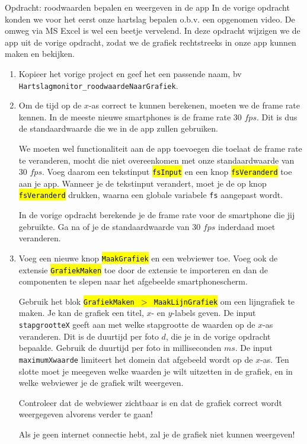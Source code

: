 \begin{opdracht}{Opdracht: roodwaarden bepalen en weergeven in de app}
	In de vorige opdracht konden we voor het eerst onze hartslag bepalen o.b.v. een opgenomen video. De omweg via MS Excel is wel een beetje vervelend. In deze opdracht wijzigen we de app uit de vorige opdracht, zodat we de grafiek rechtstreeks in onze app kunnen maken en bekijken.
	
	\begin{enumerate}
		\item Kopieer het vorige project en geef het een passende naam, bv \texttt{Hartslagmonitor\_roodwaardeNaarGrafiek}. 
		\item Om de tijd op de $x$-as correct te kunnen berekenen, moeten we de frame rate kennen. In de meeste nieuwe smartphones is de frame rate 30 $fps$. Dit is dus de standaardwaarde die we in de app zullen gebruiken.
		
		We moeten wel functionaliteit aan de app toevoegen die toelaat de frame rate te veranderen, mocht die niet overeenkomen met onze standaardwaarde van 30 $fps$. Voeg daarom een tekstinput \hl{\texttt{fsInput}} en een knop \hl{\texttt{fsVeranderd}} toe aan je app. Wanneer je de tekstinput verandert, moet je de op knop \hl{\texttt{fsVeranderd}} drukken, waarna een globale variabele \texttt{fs} aangepast wordt.
		
		In de vorige opdracht berekende je de frame rate voor de smartphone die jij gebruikte. Ga na of je de standaardwaarde van 30 $fps$ inderdaad moet veranderen.
		
		\item Voeg een nieuwe knop \hl{\texttt{MaakGrafiek}} en een webviewer toe. Voeg ook de extensie \hl{\texttt{GrafiekMaken}} toe door de extensie te importeren en dan de componenten te slepen naar het afgebeelde smartphonescherm.
		
		Gebruik het blok \hl{\texttt{GrafiekMaken $>$ MaakLijnGrafiek}} om een lijngrafiek te maken. Je kan de grafiek een titel, $x$- en $y$-labels geven. De input \texttt{stapgrootteX} geeft aan met welke stapgrootte de waarden op de $x$-as veranderen. Dit is de duurtijd per foto $d$, die je in de vorige opdracht bepaalde. Gebruik de duurtijd per foto in milliseconden $ms$. De input \texttt{maximumXwaarde} limiteert het domein dat afgebeeld wordt op de $x$-as. Ten slotte moet je meegeven welke waarden je wilt uitzetten in de grafiek, en in welke webviewer je de grafiek wilt weergeven.
		
		Controleer dat de webviewer zichtbaar is en dat de grafiek correct wordt weergegeven alvorens verder te gaan!
		
		\begin{opmerking}
			Als je geen internet connectie hebt, zal je de grafiek niet kunnen weergeven! 
		\end{opmerking}
	\end{enumerate}
\end{opdracht}
	


